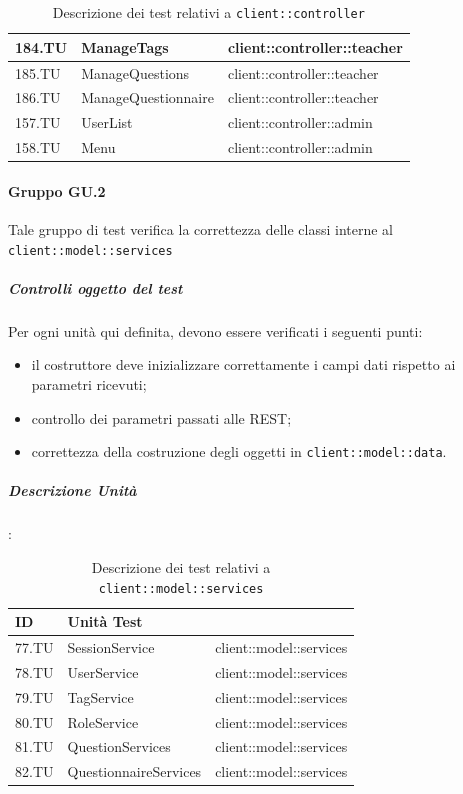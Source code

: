 \documentclass[12pt,a4paper]{article}
\begin{document}
\begin{table}[H]
\begin{center}
\begin{tabular}{p{} p{} p{}}
			184.TU & ManageTags & client::controller::teacher\\ \midrule
			185.TU & ManageQuestions & client::controller::teacher\\ \midrule
			186.TU & ManageQuestionnaire & client::controller::teacher\\ \midrule
			157.TU & UserList & client::controller::admin\\ \midrule
			158.TU & Menu & client::controller::admin\\ \midrule			
		 \bottomrule
		\end{tabular}
	\end{center}
	\caption{Descrizione dei test relativi a \texttt{client::controller}}
\end{table}

\paragraph{Gruppo GU.2 }
Tale gruppo di test verifica la correttezza delle classi interne al  \texttt{client::model::services}

\subparagraph{Controlli oggetto del test}
Per ogni unità  qui definita, devono essere verificati i seguenti punti:

\begin{itemize}
	\item il costruttore deve inizializzare correttamente i campi dati rispetto ai parametri ricevuti;
	\item controllo dei parametri passati alle  REST;
	\item correttezza della costruzione degli oggetti in \texttt{client::model::data}.
\end{itemize}

\subparagraph{Descrizione Unità}:

\begin{table}[H]
	\begin{center}
		\begin{tabular}{p{} p{} p{}}
			\toprule
			\textbf{ID}   & \textbf{Unità Test}	& \textbf{\mgls{package}} \\ \midrule
			\midrule
			77.TU & SessionService & client::model::services\\ \midrule
			78.TU & UserService & client::model::services\\ \midrule
			79.TU & TagService & client::model::services\\ \midrule
			80.TU & RoleService & client::model::services\\ \midrule
			81.TU & QuestionServices & client::model::services\\ \midrule
			82.TU & QuestionnaireServices & client::model::services\\ \midrule
			\bottomrule
		\end{tabular}
	\end{center}
	\caption{Descrizione dei test relativi a \texttt{client::model::services}}
\end{table}
\end{document}
